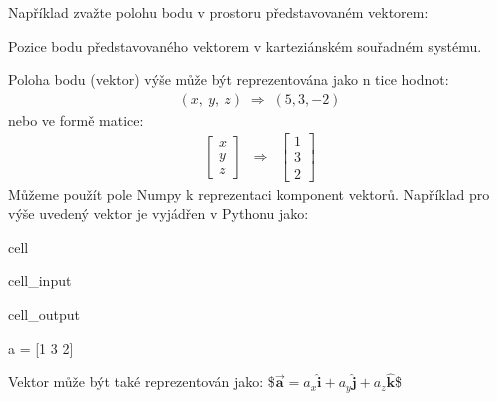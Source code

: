 \documentclass[letterpaper,10pt,english]{jupyterBook}
\begin{document}
\sphinxAtStartPar
Například zvažte polohu bodu v prostoru představovaném vektorem:

\sphinxAtStartPar


\sphinxAtStartPar
Pozice bodu představovaného vektorem v karteziánském souřadném systému.

\sphinxAtStartPar
Poloha bodu (vektor) výše může být reprezentována jako n \sphinxhyphen{}tice hodnot:
\begin{equation*}
\begin{split} (x,\: y,\: z) \; \Rightarrow \; (5, 3, -2) \end{split}
\end{equation*}
\sphinxAtStartPar
nebo ve formě matice:
\begin{equation*}
\begin{split} \begin{bmatrix} x \\y \\z \end{bmatrix} \;\; \Rightarrow  \;\; \begin{bmatrix} 1 \\3 \\2 \end{bmatrix}\end{split}
\end{equation*}
\sphinxAtStartPar
Můžeme použít pole Numpy k reprezentaci komponent vektorů.
Například pro výše uvedený vektor je vyjádřen v Pythonu jako:

\begin{sphinxuseclass}{cell}\begin{sphinxVerbatimInput}

\begin{sphinxuseclass}{cell_input}
\begin{sphinxVerbatim}[commandchars=\\\{\}]
  \PYG{p}{[}  \PYG{p}{]}
 
\end{sphinxVerbatim}

\end{sphinxuseclass}\end{sphinxVerbatimInput}
\begin{sphinxVerbatimOutput}

\begin{sphinxuseclass}{cell_output}
\begin{sphinxVerbatim}[commandchars=\\\{\}]
a = [1 3 2]
\end{sphinxVerbatim}

\end{sphinxuseclass}\end{sphinxVerbatimOutput}

\end{sphinxuseclass}
\sphinxAtStartPar
Vektor může být také reprezentován jako:
\$\( \overrightarrow{\mathbf{a}} = a_x\hat{\mathbf{i}} + a_y\hat{\mathbf{j}} + a_z\hat{\mathbf{k}} \)\$
\end{document}
